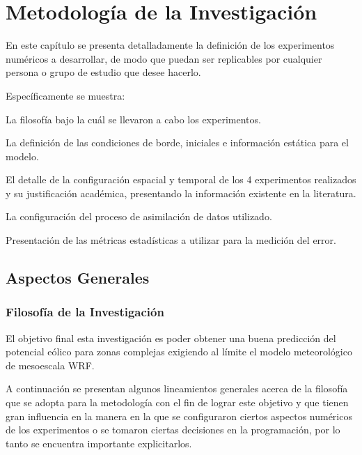 \chapter{Metodología de la Investigación}
En este capítulo se presenta detalladamente la definición de los experimentos numéricos a desarrollar, de modo que puedan ser replicables por cualquier persona o grupo de estudio que desee hacerlo. 

Específicamente se muestra: 
\begin{itemize*}
	\item La filosofía bajo la cuál se llevaron a cabo los experimentos.
	\item La definición de las condiciones de borde, iniciales e información estática para el modelo.
	\item El detalle de la configuración espacial y temporal de los 4 experimentos realizados y su justificación académica, presentando la información existente en la literatura.
	\item La configuración del proceso de asimilación de datos utilizado.
	\item Presentación de las métricas estadísticas a utilizar para la medición del error.
\end{itemize*}
\newpage
\section{Aspectos Generales}
\subsection{Filosofía de la Investigación}
El objetivo final esta investigación es poder obtener una buena predicción del potencial eólico para zonas complejas exigiendo al límite el modelo meteorológico de mesoescala WRF. 

A continuación se presentan algunos lineamientos generales acerca de la filosofía que se adopta para la metodología con el fin de lograr este objetivo y que tienen gran influencia en la manera en la que se configuraron ciertos aspectos numéricos de los experimentos o se tomaron ciertas decisiones en la programación, por lo tanto se encuentra importante explicitarlos.
